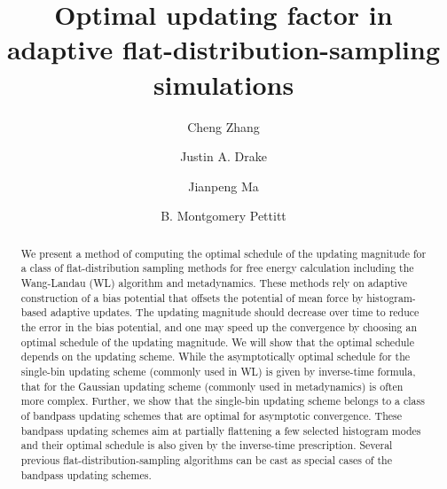 \documentclass[reprint, superscriptaddress, floatfix]{revtex4-1}
\begin{document}
\title{Optimal updating factor in adaptive flat-distribution-sampling simulations}

\author{Cheng Zhang}
\author{Justin A. Drake}
\author{Jianpeng Ma}
\author{B. Montgomery Pettitt}



\begin{abstract}
  We present a method of computing the optimal schedule
  of the updating magnitude
  for a class of flat-distribution sampling methods
  for free energy calculation including
  the Wang-Landau (WL) algorithm and metadynamics.
  These methods rely on adaptive construction of
  a bias potential that offsets
  the potential of mean force by histogram-based adaptive updates.
  The updating magnitude should decrease over time
  to reduce the error in the bias potential,
  and one may speed up the convergence by choosing an optimal schedule
  of the updating magnitude.
  We will show that
  the optimal schedule depends on the updating scheme.
  While the asymptotically optimal schedule for
  the single-bin updating scheme (commonly used in WL)
  is given by inverse-time formula,
  that for the Gaussian updating scheme (commonly used in metadynamics)
  is often more complex.
  Further,
  we show that the single-bin updating scheme
  belongs to a class of bandpass updating schemes
  that are optimal for asymptotic convergence.
  These bandpass updating schemes aim at
  partially flattening a few selected histogram modes
  and their optimal schedule
  is also given by the inverse-time prescription.
  Several previous flat-distribution-sampling algorithms
  can be cast as special cases of the bandpass updating schemes.
\end{abstract}
\end{document}
